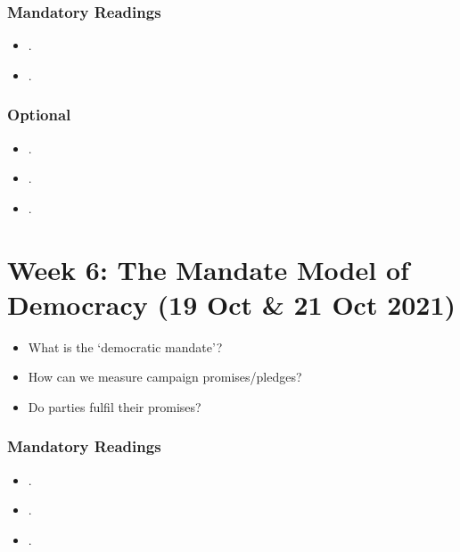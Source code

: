 \documentclass[abstract=on,parskip=full,headings=standardclasses,fontsize=11pt,paper=a4]{scrartcl}
\begin{document}
\subsubsection*{Mandatory Readings}
\begin{itemize}
\item {}.
\item {}.
\end{itemize}


\subsubsection*{Optional}
\begin{itemize}
\item {}.
\item {}.
\item {}.
\end{itemize}





\section{Week 6:  The Mandate Model of Democracy (19 Oct \& 21 Oct 2021)}


\begin{itemize}
\renewcommand\labelitemi{--}
\item What is the `democratic mandate'? 
\item How can we measure campaign promises/pledges?
\item Do parties fulfil their promises?
\end{itemize}

\subsubsection*{Mandatory Readings}
\begin{itemize}
\item {}.
\item {}.
\item {}.
\end{itemize}
\end{document}
